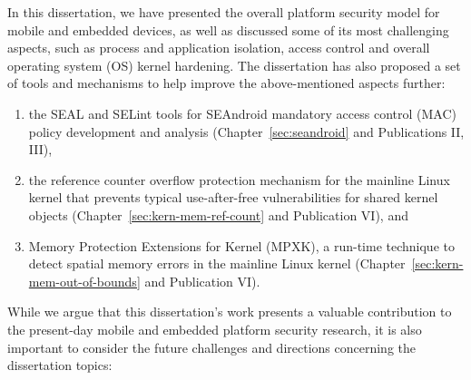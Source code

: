 
In this dissertation, we have presented the overall platform security model for mobile and embedded devices, as well as discussed some of its most challenging aspects, such as process and application isolation, access control and overall operating system (OS) kernel hardening.
The dissertation has also proposed a set of tools and mechanisms to help improve the above-mentioned aspects further: 
\begin{enumerate}
	\item the SEAL and SELint tools for SEAndroid mandatory access control (MAC) policy development and analysis (Chapter~\ref{sec:seandroid} and Publications II, III),
	\item the reference counter overflow protection mechanism for the mainline Linux kernel that prevents typical use-after-free vulnerabilities for shared kernel objects (Chapter~\ref{sec:kern-mem-ref-count} and Publication VI), and
	\item Memory Protection Extensions for Kernel (MPXK), a run-time technique to detect spatial memory errors in the mainline Linux kernel (Chapter~\ref{sec:kern-mem-out-of-bounds} and Publication VI). 
\end{enumerate}

While we argue that this dissertation's work presents a valuable contribution to the present-day mobile and embedded platform security research, it is also important to consider the future challenges and directions concerning the dissertation topics:

